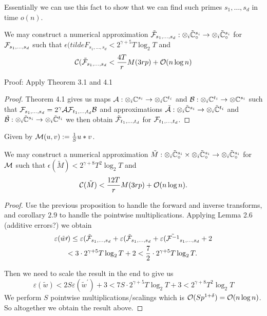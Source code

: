 Essentially we can use this fact to show that we can find such primes $s_1, \ldots, s_d$ in time $o(n)$.

\begin{proposition}
    We may construct a numerical approximation $\tilde{\mathcal F}_{s_1, \ldots, s_d}: \otimes_i \tilde{{\mathbb C}}_\circ^{s_i} \to \otimes_i \tilde{{\mathbb C}}_\circ^{s_i}$ for $\mathcal F_{s_1, \ldots, s_d}$ such that $\epsilon(tilde{F}_{s_1, \ldots, s_d} < 2^{\gamma + 5} T \log_2 T$ and
    \[
        \mathcal C(\tilde{\mathcal F}_{s_1, \ldots, s_d} < \frac{4T}{r} M(3rp) + \mathcal O(n \log n)
    \]
\end{proposition}

Proof: Apply Theorem 3.1 and 4.1
\begin{proof}
    Theorem 4.1 gives us maps $\mathcal A: \otimes_i {\mathbb C}^{s_i} \to \otimes_i {\mathbb C}^{t_i}$ and $\mathcal B: \otimes_i {\mathbb C}^{t_i} \to \otimes {\mathbb C}^{s_i}$ such that $\mathcal F_{s_1, \ldots, s_d} = 2^\gamma \mathcal A\mathcal F_{t_1, \ldots, t_d} \mathcal B$ and approximations $\tilde{\mathcal A}: \otimes_i \tilde{{\mathbb C}}^{s_i} \to \otimes_i \tilde{{\mathbb C}}^{t_i}$ and $\tilde{\mathcal B}: \otimes_i \tilde{{\mathbb C}}^{s_i} \to \otimes_i \tilde{{\mathbb C}}^{t_i}$ we then obtain $\tilde{\mathcal F}_{t_1, \ldots, t_d}$ for $\mathcal F_{t_1, \ldots, t_d}$. 
\end{proof}

Given by $\mathcal M(u, v) := \frac{1}{S}u \ast v$.

\begin{proposition}
    We may construct a numerical approximation $\tilde{M}: \otimes_i \tilde{{\mathbb C}}_\circ^{s_i} \times \otimes_i \tilde{{\mathbb C}}_\circ^{s_i} \to \otimes_i \tilde{{\mathbb C}}_\circ^{s_i}$ for $\mathcal M$ such that $\epsilon(\tilde{M}) < 2^{\gamma + 8}T^2 \log_2T$ and
    \[
        \mathcal C(\tilde{M}) < \frac{12T}{r} M(3rp) + \mathcal O(n \log n).
    \]
\end{proposition}

\begin{proof}
    Use the previous proposition to handle the forward and inverse transforms, and corollary $2.9$ to handle the pointwise multiplications. Applying Lemma 2.6 (additive errors?) we obtain
    \begin{align*}
        \varepsilon(\tilde{w}&\prime) \leq \varepsilon(\tilde{\mathcal F}_{s_1, \ldots, s_d} + \varepsilon(\tilde{\mathcal F}_{s_1, \ldots, s_d} + \varepsilon(\tilde{\mathcal F^{-1}}_{s_1, \ldots, s_d} + 2\\
                             &< 3 \cdot 2^{\gamma + 5}T\log_2 T + 2 < \frac{7}{2} \cdot 2^{\gamma + 5}T \log_2 T.
    \end{align*}

    Then we need to scale the result in the end to give us
    \[
        \varepsilon(\tilde{w}) < 2S\varepsilon(\tilde{w}^\prime) + 3 < 7S \cdot 2^{\gamma + 5} T \log_2 T + 3 < 2^{\gamma + 8}T^2 \log_2 T
    \]
    We perform $S$ pointwise multiplications/scalings which is $\mathcal O(Sp^{1 + \delta}) = \mathcal O(n \log n)$. So altogether we obtain the result above.
\end{proof}

